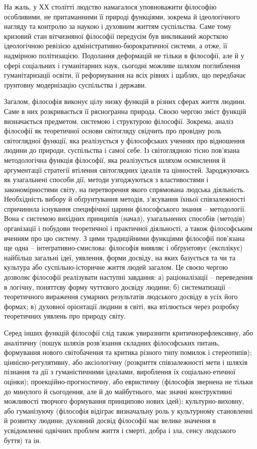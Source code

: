 На жаль, у ХХ столітті людство намагалося уповноважити філософію
особливими, не притаманними її природі функціями, зокрема й ідеологічного
нагляду та контролю за наукою і духовним життям суспільства. Саме тому
кризовий стан вітчизняної філософії передусім був викликаний жорсткою
ідеологічною ревізією адміністративно-бюрократичної системи, а отже, її 
надмірною політизацією. Подолання деформацій не тільки в філософії, але й у
сфері соціальних і гуманітарних наук, сьогодні можливе шляхом поглиблення
гуманітаризації освіти, її реформування на всіх рівнях і щаблях, що передбачає
ґрунтовну модернізацію суспільства і держави.

Загалом, філософія виконує цілу низку функцій в різних сферах життя
людини. Саме в них розкривається її рясногранна природа. Своєю чергою зміст
функцій визначається предметом, системою і структурою філософії. Зокрема,
аналіз філософії як теоретичної основи світогляду свідчить про провідну роль
світоглядної функції, яка реалізується у філософських ученнях про відношення
людини до природи, суспільства і самої себе. Із світоглядною тісно пов’язана
методологічна функція філософії, яка реалізується шляхом осмислення й
аргументації стратегії втілення світоглядних ідеалів та цінностей.
Зароджуючись як узагальнені способи дії, методи узгоджуються з
властивостями і закономірностями світу, на перетворення якого спрямована
людська діяльність. Необхідність вибору й обґрунтування методів, з’ясування
їхньої співзалежності спричинила існування специфічної царини філософського
знання – методології. Вона є системою вихідних принципів (начал),
узагальнених способів (методів) організації і побудови теоретичної і практичної
діяльності, а також філософським вченням про цю систему. З цими
традиційними функціями філософії пов’язана ще одна – інтегративно-смислова:
філософія виявляє і обґрунтовує (експлікує) найбільш загальні ідеї, уявлення,
форми досвіду, на яких базується та чи та культура або суспільно-історичне
життя людей загалом. Це своєю чергою дозволяє філософії реалізувати
наступні завдання: а) раціоналізації – переведення в логічну, поняттєву форму
чуттєвого досвіду людини; б) систематизації – теоретичного вираження
сумарних результатів людського досвіду в усіх його формах; в) духовної
орієнтації людини в світі, яка втілюється через розробку теоретичних уявлень
про природу світу.

Серед інших функцій філософії слід також увиразнити критичнорефлексивну, або аналітичну (пошук шляхів розв’язання складних
філософських питань, формування нового світобачення та критика різного типу
помилок і стереотипів); ціннісно-регулятивну, або аксіологічну (розкриття
співзалежності мети і шляхів пізнання та дії з гуманістичними ідеалами,
вироблення їх соціально-етичної оцінки); проекційно-прогностичну, або
евристичну (філософія звернена не тільки до минулого й сьогодення, але й до 
майбутнього, має значні конструктивні можливості творчого формування
принципово нових ідей); культурно-виховну, або гуманізуючу (філософія
відіграє визначальну роль у культурному становленні й розвитку людини;
духовний досвід філософії має велике значення в усвідомленні одвічних
проблем життя і смерті, добра і зла, сенсу людського буття) та ін.

